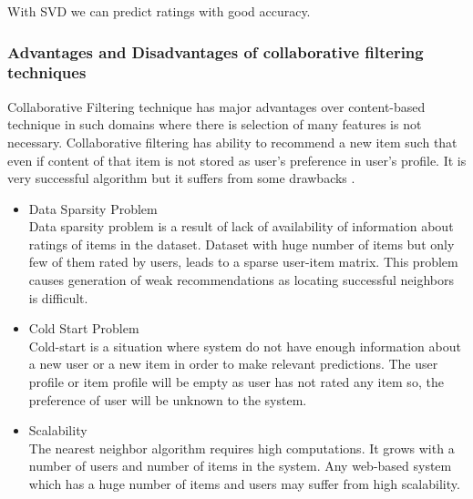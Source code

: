 \noindent With SVD we can predict ratings with good accuracy.

\subsubsection{Advantages and Disadvantages of collaborative filtering techniques}
\label{cf_pros_cons}
Collaborative Filtering technique has major advantages over content-based technique in such domains where there is selection of many features is not necessary. Collaborative filtering has ability to recommend a new item such that even if content of that item is not stored as user's preference in user's profile. It is very successful algorithm but it suffers from some drawbacks \cite{10}.
\begin{itemize}
\item Data Sparsity Problem \\
Data sparsity problem is a result of lack of availability of information about ratings of items in the dataset. Dataset with huge number of items but only few of them rated by users, leads to a sparse user-item matrix. This problem causes generation of weak recommendations as locating successful neighbors is difficult.
\item Cold Start Problem \\
Cold-start is a situation where system do not have enough information about a new user or a new item in order to make relevant predictions. The user profile or item profile will be empty as user has not rated any item so, the preference of user will be unknown to the system.
\item Scalability \\
The nearest neighbor algorithm requires high computations. It grows with a number of users and number of items in the system. Any web-based system which has a huge number of items and users may suffer from high scalability.

\end{itemize}

